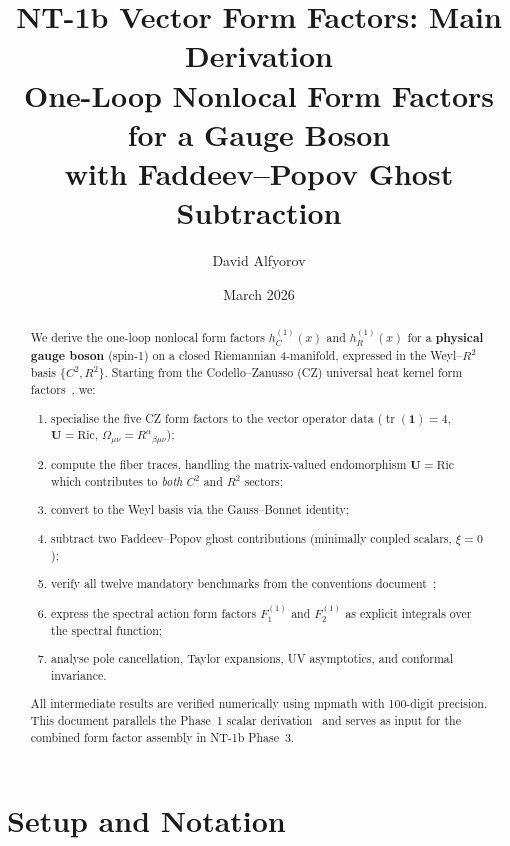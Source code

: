 \documentclass[11pt,a4paper]{article}
\title{%
  \textbf{NT-1b Vector Form Factors: Main Derivation}\\[6pt]
  \large One-Loop Nonlocal Form Factors for a Gauge Boson\\
  with Faddeev--Popov Ghost Subtraction
}
\author{David Alfyorov}
\date{March 2026}
\newcommand{\Id}{\mathbf{1}}
\newcommand{\tr}{\operatorname{tr}}
\theoremstyle{definition}
\theoremstyle{remark}
\begin{document}
\maketitle

\begin{center}
\end{center}

\thispagestyle{empty}

\begin{abstract}
We derive the one-loop nonlocal form factors $h_C^{(1)}(x)$ and
$h_R^{(1)}(x)$ for a \textbf{physical gauge boson} (spin-1) on a closed
Riemannian 4-manifold, expressed in the Weyl--$R^2$ basis $\{C^2, R^2\}$.
Starting from the Codello--Zanusso (CZ) universal heat kernel form
factors~\cite{CZ2012}, we:
\begin{enumerate}[nosep]
\item specialise the five CZ form factors to the vector operator data
  ($\tr(\Id)=4$, $\mathbf{U}=\mathrm{Ric}$,
  $\Omega_{\mu\nu}=R^\alpha{}_{\beta\mu\nu}$);
\item compute the fiber traces, handling the matrix-valued endomorphism
  $\mathbf{U}=\mathrm{Ric}$ which contributes to \emph{both}
  $C^2$ and $R^2$ sectors;
\item convert to the Weyl basis via the Gauss--Bonnet identity;
\item subtract two Faddeev--Popov ghost contributions
  (minimally coupled scalars, $\xi=0$);
\item verify all twelve mandatory benchmarks from the conventions
  document~\cite{NT1b_vector_conventions};
\item express the spectral action form factors $F_1^{(1)}$ and
  $F_2^{(1)}$ as explicit integrals over the spectral function;
\item analyse pole cancellation, Taylor expansions, UV asymptotics,
  and conformal invariance.
\end{enumerate}
All intermediate results are verified numerically using mpmath
with 100-digit precision.
This document parallels the Phase~1 scalar derivation~\cite{NT1b_scalar}
and serves as input for the combined form factor assembly in NT-1b Phase~3.
\end{abstract}

\tableofcontents
\newpage


\section{Setup and Notation}
\label{sec:setup}
\end{document}
